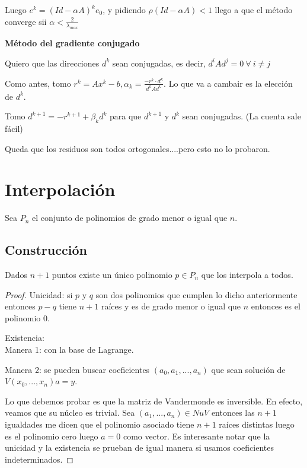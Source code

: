 \documentclass[10pt,a4paper,final]{report}
\begin{document}
Luego $e^k = (Id - \alpha A)^k e_0$, y pidiendo $\rho(Id-\alpha A)<1$ llego a que el método converge sii $\alpha < \frac{2}{\lambda_{max}}$


\textbf{Método del gradiente conjugado}

Quiero que las direcciones $d^k$ sean conjugadas, es decir, $d^i A d^j = 0\ \forall\ i\neq j$

Como antes, tomo $r^k = A x^k-b, \alpha_k = \frac{-r^k \cdot d^k}{d^k A d^k}$. Lo que va a cambair es la elección de $d^k$.

Tomo $d^{k+1} = - r^{k+1} + \beta_k d^k$ para que $d^{k+1}$ y $d^k$ sean conjugadas. (La cuenta sale fácil)

Queda que los residuos son todos ortogonales....pero esto no lo probaron.


\section{Interpolación}

Sea $P_n$ el conjunto de polinomios de grado menor o igual que $n$.

\subsection{Construcción}
\begin{theorem}Dados $n+1$ puntos existe un único polinomio $p\in P_n$ que los interpola a todos.
\end{theorem}

\begin{proof}

Unicidad: si $p$ y $q$ son dos polinomios que cumplen lo dicho anteriormente entonces $p-q$ tiene $n+1$ raíces y es de grado menor o igual que $n$ entonces es el polinomio 0.


Existencia: \\

Manera 1: con la base de Lagrange.

Manera 2: se pueden buscar coeficientes $(a_0,a_1,...,a_n)$ que sean solución de $V(x_0,...,x_n) a = y$.

Lo que debemos probar es que la matriz de Vandermonde es inversible. En efecto, veamos que su núcleo es trivial. Sea $(a_1,...,a_n) \in Nu V$ entonces las $n+1$ igualdades me dicen que el polinomio asociado tiene $n+1$ raíces distintas luego es el polinomio cero luego $a=0$ como vector. Es interesante notar que la unicidad y la existencia se prueban de igual manera si usamos coeficientes indeterminados.


\end{proof}
\end{document}
